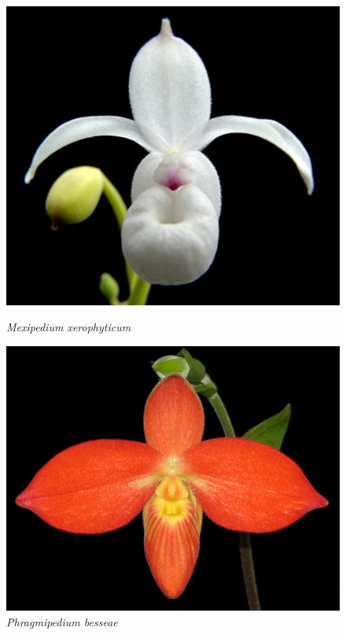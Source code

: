 \documentclass[]{beamer}
\begin{document}
\begin{frame}
        \begin{figure}[!htb]
              \includegraphics[width=\linewidth]{Mexipedium_xerophyticum}
              \caption*{\textit{Mexipedium xerophyticum}}
            \endminipage\hfill
              \includegraphics[width=\linewidth]{Phragmipedium_besseae}
              \caption*{\textit{Phragmipedium besseae}}
            \endminipage\hfill

\end{figure}
\end{frame}
\end{document}
